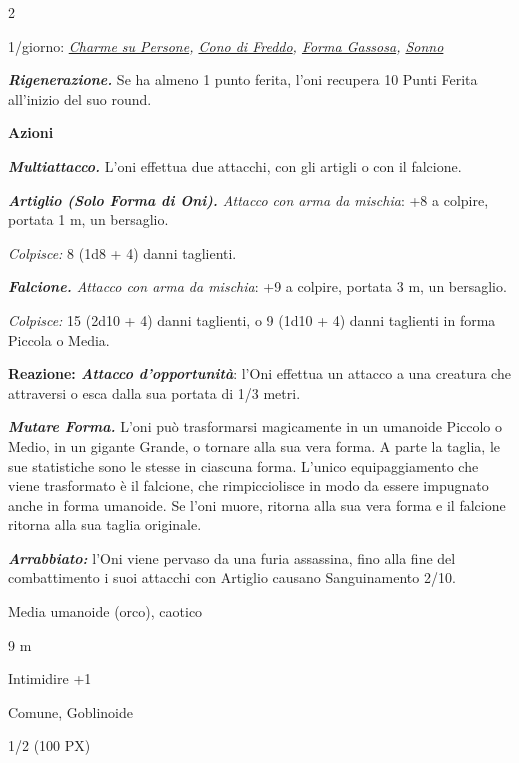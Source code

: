 \begin{multicols}{2}
{1/giorno: \emph{\hyperlink{Charme su Persone}{Charme su Persone}, \hyperlink{Cono di Freddo}{Cono di Freddo}, \hyperlink{Forma Gassosa}{Forma Gassosa}, \hyperlink{Sonno}{Sonno}}

\emph{\textbf{Rigenerazione.}} Se ha almeno 1 punto ferita, l'oni recupera 10 Punti Ferita all'inizio del suo round.

\textbf{Azioni}

\emph{\textbf{Multiattacco.}} L'oni effettua due attacchi, con gli artigli o con il falcione.

\emph{\textbf{Artiglio (Solo Forma di Oni).} Attacco con arma da mischia}: +8 a colpire, portata 1 m, un bersaglio.

\emph{Colpisce:} 8 (1d8 + 4) danni taglienti.

\emph{\textbf{Falcione.} Attacco con arma da mischia}: +9 a colpire, portata 3 m, un bersaglio.

\emph{Colpisce:} 15 (2d10 + 4) danni taglienti, o 9 (1d10 + 4) danni taglienti in forma Piccola o Media.

\textbf{Reazione: \emph{Attacco d'opportunità}}: l'Oni effettua un attacco a una creatura che attraversi o esca dalla sua portata di 1/3 metri.

\emph{\textbf{Mutare Forma.}} L'oni può trasformarsi magicamente in un umanoide Piccolo o Medio, in un gigante Grande, o tornare alla sua vera forma. A parte la taglia, le sue statistiche sono le stesse in ciascuna forma. L'unico equipaggiamento che viene trasformato è il falcione, che rimpicciolisce in modo da essere impugnato anche in forma umanoide. Se l'oni muore, ritorna alla sua vera forma e il falcione ritorna alla sua taglia originale.

\emph{\textbf{Arrabbiato:}} l'Oni viene pervaso da una furia assassina, fino alla fine del combattimento i suoi attacchi con Artiglio causano Sanguinamento 2/10.

\begin{description}[noitemsep, topsep=0pt, parsep=0pt, partopsep=0pt, itemsep=1pt, leftmargin=2.35cm,  labelwidth=2.2cm, itemindent=0cm, listparindent=0pt] %
\setlength{\baselineskip}{10pt}
\item[\textbf{Taglia/Tipo}] Media umanoide (orco), caotico
\item[\textbf{Caratt.}] 
\item[\textbf{Punti Ferita}] 
\item[\textbf{Movimento}] 9 m
\item[\textbf{Tiri Salvez.}] 
\item[\textbf{Comp.}] Intimidire +1
\item[\textbf{Sensi}] 
\item[\textbf{Linguaggi}] Comune, Goblinoide
\item[\textbf{Sfida}] 1/2 (100 PX)
\end{description}
\smallskip

}
\end{multicols}
